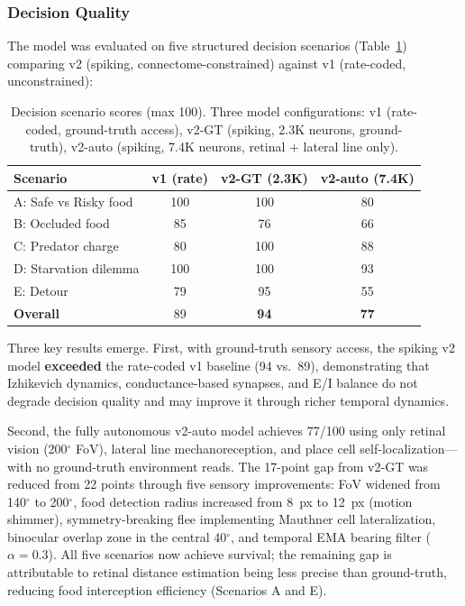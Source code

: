 \documentclass[9pt]{elife}
\begin{document}
\subsubsection{Decision Quality}

The model was evaluated on five structured decision scenarios
(Table~\ref{tab:scenarios}) comparing v2 (spiking, connectome-constrained)
against v1 (rate-coded, unconstrained):

\begin{table}[h!]
\centering
\caption{Decision scenario scores (max 100). Three model configurations:
v1 (rate-coded, ground-truth access), v2-GT (spiking, 2.3K neurons, ground-truth),
v2-auto (spiking, 7.4K neurons, retinal + lateral line only).}
\label{tab:scenarios}
\begin{tabular}{l c c c}
\hline
\textbf{Scenario} & \textbf{v1 (rate)} & \textbf{v2-GT (2.3K)} & \textbf{v2-auto (7.4K)} \\
\hline
A: Safe vs Risky food   & 100 & 100 & 80 \\
B: Occluded food        & 85  & 76  & 66 \\
C: Predator charge      & 80  & 100 & 88 \\
D: Starvation dilemma   & 100 & 100 & 93 \\
E: Detour               & 79  & 95  & 55 \\
\hline
\textbf{Overall}        & 89  & \textbf{94} & \textbf{77} \\
\hline
\end{tabular}
\end{table}

Three key results emerge.
First, with ground-truth sensory access, the spiking v2 model \textbf{exceeded}
the rate-coded v1 baseline (94 vs.\ 89), demonstrating that Izhikevich
dynamics, conductance-based synapses, and E/I balance do not degrade
decision quality and may improve it through richer temporal dynamics.

Second, the fully autonomous v2-auto model achieves 77/100 using only
retinal vision (200$^\circ$ FoV), lateral line mechanoreception, and
place cell self-localization---with no ground-truth environment reads.
The 17-point gap from v2-GT was reduced from 22 points through five
sensory improvements: FoV widened from 140$^\circ$ to 200$^\circ$,
food detection radius increased from 8~px to 12~px (motion shimmer),
symmetry-breaking flee implementing Mauthner cell lateralization,
binocular overlap zone in the central 40$^\circ$, and temporal EMA
bearing filter ($\alpha=0.3$).
All five scenarios now achieve survival; the remaining gap is attributable
to retinal distance estimation being less precise than ground-truth,
reducing food interception efficiency (Scenarios A and E).
\end{document}
